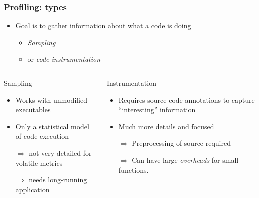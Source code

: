\documentclass[dvipsnames,presentation,aspectratio=169,14pt]{beamer}
\begin{document}
\begin{frame}
  \frametitle{Profiling: types}
  \begin{itemize}
  \item Goal is to gather information about what a code is doing
    \begin{itemize}
    \item \emph{Sampling}
    \item or \emph{code instrumentation}
    \end{itemize}
  \end{itemize}
  \begin{columns}
    \begin{column}{0.45\textwidth}
      \begin{exampleblock}{Sampling}
        \begin{itemize}
        \item Works with unmodified executables
        \item Only a statistical model of code execution
        \item[$\Rightarrow$] not very detailed for volatile metrics
        \item[$\Rightarrow$] needs long-running application
        \end{itemize}
      \end{exampleblock}
    \end{column}
    \begin{column}{0.45\textwidth}
      \begin{exampleblock}{Instrumentation}
        \begin{itemize}
        \item Requires source code annotations to capture
          ``interesting'' information
        \item Much more details and focused
        \item[$\Rightarrow$] Preprocessing of source required
        \item[$\Rightarrow$] Can have large \emph{overheads} for small functions.
        \end{itemize}
      \end{exampleblock}
    \end{column}
  \end{columns}
\end{frame}
\end{document}
